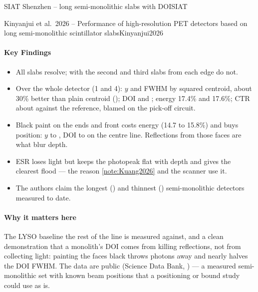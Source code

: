 \begin{programnote}{SIAT Shenzhen -- long semi-monolithic slabs with DOI}{SIAT}
\begin{papernote}{Kinyanjui et al.\ 2026 -- Performance of high-resolution PET detectors based on long semi-monolithic scintillator slabs}{Kinyanjui2026}
\paragraph{Key Findings}
\begin{itemize}
	\item All  slabs resolve; with  the second and third slabs
		from each edge do not.
	\item Over the whole detector (1 and 4): $y$  and  FWHM by
		squared centroid, about 30\% better than plain centroid ();
		DOI  and ; energy 17.4\% and 17.6\%; CTR about
		 against the reference, blamed on the pick-off circuit.
	\item Black paint on the ends and front costs energy (14.7 to 15.8\%) and
		buys position: $y$  to , DOI  to
		 on the centre line. Reflections from those faces are what
		blur depth.
	\item ESR loses light but keeps the photopeak flat with depth and gives the
		clearest flood --- the reason \ref{note:Kuang2026} and the scanner use
		it.
	\item The authors claim the longest () and thinnest ()
		semi-monolithic detectors measured to date.
\end{itemize}

\paragraph{Why it matters here}
The LYSO baseline the rest of the line is measured against, and a clean
demonstration that a monolith's DOI comes from killing reflections, not from
collecting light: painting the faces black throws photons away and nearly
halves the DOI FWHM. The data are public (Science Data Bank,
) --- a measured semi-monolithic set with
known beam positions that a positioning or bound study could use as is.

\end{papernote}


\end{programnote}
